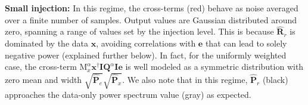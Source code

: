 \documentclass[preprint2,numberedappendix,tighten]{aastex6}  %
\begin{document}
{\bf Small injection:}
In this regime, the cross-terms (red) behave as noise averaged over a finite number of samples. Output values are Gaussian distributed around zero, spanning a range of values set by the injection level. This is because $\widehat{\textbf{R}}_{r}$ is dominated by the data $\textbf{x}$, avoiding correlations with $\textbf{e}$ that can lead to solely negative power (explained further below). In fact, for the uniformly weighted case, the cross-term  $\text{M}^{\alpha}_{x}\textbf{x}^{\dagger}\textbf{I}\textbf{Q}^{\alpha}\textbf{I}\textbf{e}$ is well modeled as a symmetric distribution with zero mean and width $\sqrt{\widehat{\textbf{P}}_e}\sqrt{\widehat{\textbf{P}}_x}$. We also note that in this regime, $\widehat{\textbf{P}}_{r}$ (black) approaches the data-only power spectrum value (gray) as expected. %
\end{document}
